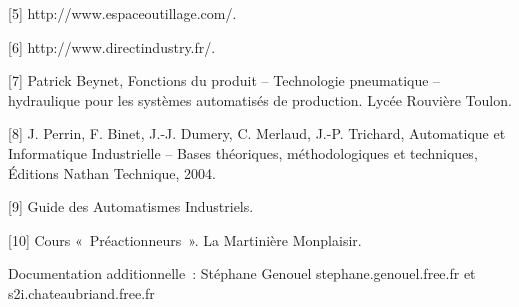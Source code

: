 \documentclass[
]{article}
\begin{document}
{[}5{]} http://www.espaceoutillage.com/.

{[}6{]} http://www.directindustry.fr/.

{[}7{]} Patrick Beynet, Fonctions du produit -- Technologie pneumatique
-- hydraulique pour les systèmes automatisés de production. Lycée
Rouvière Toulon.

{[}8{]} J. Perrin, F. Binet, J.-J. Dumery, C. Merlaud, J.-P. Trichard,
Automatique et Informatique Industrielle -- Bases théoriques,
méthodologiques et techniques, Éditions Nathan Technique, 2004.

{[}9{]} Guide des Automatismes Industriels.

{[}10{]} Cours «~Préactionneurs~». La Martinière Monplaisir.

Documentation additionnelle~: Stéphane Genouel stephane.genouel.free.fr
et s2i.chateaubriand.free.fr
\end{document}
